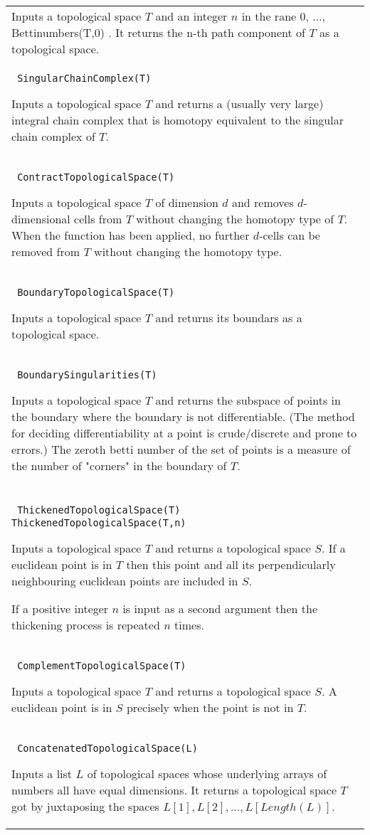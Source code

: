 \documentclass[a4paper,11pt]{report}
\begin{document}
{\begin{center}
\begin{tabular}{|l|}
 Inputs a topological space $T$ and an integer $n$ in the rane 0, ..., Bettinumbers(T,0) . It returns the n-th path component of $T$ as a topological space. \\
 \index{SingularChainComplex} \texttt{ SingularChainComplex(T)} 

 Inputs a topological space $T$ and returns a (usually very large) integral chain complex that is homotopy
equivalent to the singular chain complex of $T$. \\
 \index{ContractTopologicalSpace} \texttt{ ContractTopologicalSpace(T)} 

 Inputs a topological space $T$ of dimension $d$ and removes $d$-dimensional cells from $T$ without changing the homotopy type of $T$. When the function has been applied, no further $d$-cells can be removed from $T$ without changing the homotopy type. \\
 \index{BoundaryTopologicalSpace} \texttt{ BoundaryTopologicalSpace(T)} 

 Inputs a topological space $T$ and returns its boundars as a topological space. \\
 \index{BoundarySingularities} \texttt{ BoundarySingularities(T)} 

 Inputs a topological space $T$ and returns the subspace of points in the boundary where the boundary is not
differentiable. (The method for deciding differentiability at a point is
crude/discrete and prone to errors.) The zeroth betti number of the set of
points is a measure of the number of "corners" in the boundary of $T$. \\
 \index{ThickenedTopologicalSpace} \texttt{ ThickenedTopologicalSpace(T)} \texttt{ ThickenedTopologicalSpace(T,n)} 

 Inputs a topological space $T$ and returns a topological space $S$. If a euclidean point is in $T$ then this point and all its perpendicularly neighbouring euclidean points are
included in $S$. 

 If a positive integer $n$ is input as a second argument then the thickening process is repeated $n$ times. \\
 \index{ComplementTopologicalSpace} \texttt{ ComplementTopologicalSpace(T)} 

 Inputs a topological space $T$ and returns a topological space $S$. A euclidean point is in $S$ precisely when the point is not in $T$. \\
 \index{ConcatenatedTopologicalSpace} \texttt{ ConcatenatedTopologicalSpace(L)} 

 Inputs a list $L$ of topological spaces whose underlying arrays of numbers all have equal
dimensions. It returns a topological space $T$ got by juxtaposing the spaces $L[1], L[2], ..., L[Length(L)]$. \\
\end{tabular}\\[2mm]
\end{center}

 }
\end{document}
